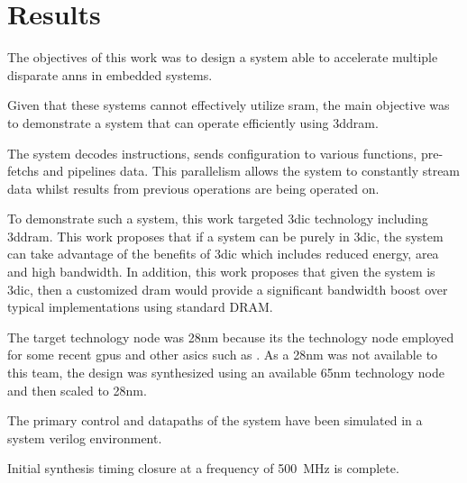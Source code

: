 
\chapter{Results}
\label{sec:Results}
The objectives of this work was to design a system able to accelerate multiple disparate \acp{ann} in embedded systems.
\iffalse
This means systems that are not designed to process multiple requests of essentially the same operation.
\fi
Given that these systems cannot effectively utilize \ac{sram}, the main objective was to demonstrate a system that can operate efficiently using \ac{3ddram}.

The system decodes instructions, sends configuration to various functions, pre-fetchs and pipelines data.
This parallelism allows the system to constantly stream data whilst results from previous operations are being operated on.

To demonstrate such a system, this work targeted \ac{3dic} technology including \ac{3ddram}. This work proposes that if a system can be purely in \ac{3dic}, the system can take advantage of the benefits
of \ac{3dic} which includes reduced energy, area and high bandwidth.
In addition, this work proposes that given the system is \ac{3dic}, then a customized \ac{dram} would provide a significant bandwidth boost over typical implementations using standard DRAM.
\iffalse
To ensure the system was purely \ac{3dic}, the area of the system Manager and Processing Engine has to stay within the physical footprint of the \ac{3ddram}.
\fi

The target technology node was 28nm because its the technology node employed for some recent \acp{gpu} and other \acp{asic} such as \cite{jouppi2017datacenter}.
As a 28nm was not available to this team, the design was synthesized using an available 65nm technology node and then scaled to 28nm.

The primary control and datapaths of the system have been simulated in a system verilog environment. 
\iffalse
It has been synthesized using a 65nm technology node.
\fi
Initial synthesis timing closure at a frequency of \SI{500}{\mega\hertz} is complete.

